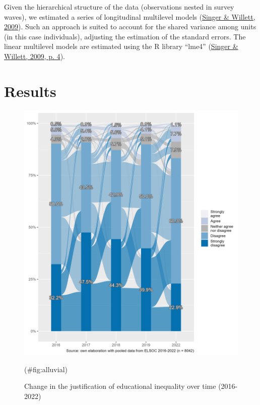 \documentclass[
  12pt,
  a4paper,
]{article}
\begin{document}
Given the hierarchical structure of the data (observations nested in
survey waves), we estimated a series of longitudinal multilevel models
(\protect\hyperlink{ref-singer_applied_2009}{Singer \& Willett, 2009}).
Such an approach is suited to account for the shared variance among
units (in this case individuals), adjusting the estimation of the
standard errors. The linear multilevel models are estimated using the R
library ``lme4'' (\protect\hyperlink{ref-singer_applied_2009}{Singer \&
Willett, 2009, p. 4}).

\hypertarget{results}{%
\section{Results}\label{results}}

\begin{figure}[H]

{\centering \includegraphics[width=0.85\linewidth]{output/graphs/alluvial_dep} 

}

\caption{Change in the justification of educational inequality over time (2016-2022)}(\#fig:alluvial)
\end{figure}
\end{document}
